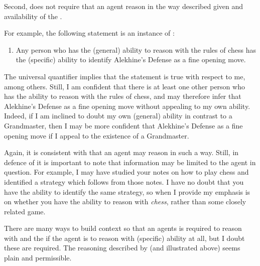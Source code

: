 \begin{note}
  Second, \eA{} does not require that an agent reason in the way described given \gsi{} and availability of the \aben{}.

  For example, the following statement is an instance of \gsi{}:
  \begin{enumerate}
  \item Any person who has the (general) ability to reason with the rules of chess has the (specific) ability to identify Alekhine's Defense as a fine opening move.
  \end{enumerate}
  The universal quantifier implies that the statement is true with respect to me, among others.
  Still, I am confident that there is at least one other person who has the ability to reason with the rules of chess, and may therefore infer that Alekhine's Defense as a fine opening move without appealing to my own ability.
  Indeed, if I am inclined to doubt my own (general) ability in contrast to a Grandmaster, then I may be more confident that Alekhine's Defense as a fine opening move if I appeal to the existence of a Grandmaster.

  Again, it is consistent with \eA{} that an agent may reason in such a way.
  Still, in defence of \eA{} it is important to note that \gsi{} information may be limited to the agent in question.
  For example, I may have studied your notes on how to play chess and identified a strategy which follows from those notes.
  I have no doubt that you have the ability to identify the same strategy, so when I provide \gsi{} my emphasis is on whether you have the ability to reason with \emph{chess}, rather than some closely related game.

  There are many ways to build context so that an agents is required to reason with \gsi{} and the \aben{} if the agent is to reason with (specific) ability at all, but I doubt these are required.
  The reasoning described by \eA{} (and illustrated above) seems plain and permissible.
\end{note}

